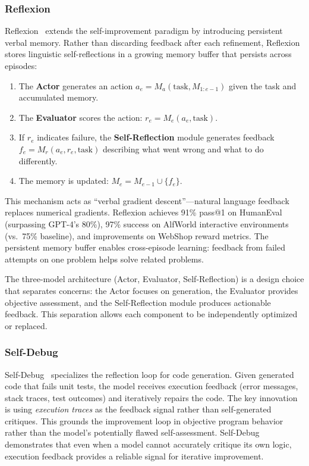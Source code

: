 \documentclass[11pt,a4paper]{article}
\begin{document}
\subsubsection{Reflexion}

Reflexion~\citep{shinn2023reflexion} extends the self-improvement paradigm by introducing persistent verbal memory. Rather than discarding feedback after each refinement, Reflexion stores linguistic self-reflections in a growing memory buffer that persists across episodes:

\begin{enumerate}
\item The \textbf{Actor} generates an action $a_e = M_a(\text{task}, M_{1:e-1})$ given the task and accumulated memory.
\item The \textbf{Evaluator} scores the action: $r_e = M_e(a_e, \text{task})$.
\item If $r_e$ indicates failure, the \textbf{Self-Reflection} module generates feedback $f_e = M_r(a_e, r_e, \text{task})$ describing what went wrong and what to do differently.
\item The memory is updated: $M_e = M_{e-1} \cup \{f_e\}$.
\end{enumerate}

This mechanism acts as ``verbal gradient descent''---natural language feedback replaces numerical gradients. Reflexion achieves 91\% pass@1 on HumanEval (surpassing GPT-4's 80\%), 97\% success on AlfWorld interactive environments (vs.\ 75\% baseline), and improvements on WebShop reward metrics. The persistent memory buffer enables cross-episode learning: feedback from failed attempts on one problem helps solve related problems.

The three-model architecture (Actor, Evaluator, Self-Reflection) is a design choice that separates concerns: the Actor focuses on generation, the Evaluator provides objective assessment, and the Self-Reflection module produces actionable feedback. This separation allows each component to be independently optimized or replaced.

\subsubsection{Self-Debug}

Self-Debug~\citep{chen2024selfdebug} specializes the reflection loop for code generation. Given generated code that fails unit tests, the model receives execution feedback (error messages, stack traces, test outcomes) and iteratively repairs the code. The key innovation is using \emph{execution traces} as the feedback signal rather than self-generated critiques. This grounds the improvement loop in objective program behavior rather than the model's potentially flawed self-assessment. Self-Debug demonstrates that even when a model cannot accurately critique its own logic, execution feedback provides a reliable signal for iterative improvement.
\end{document}
